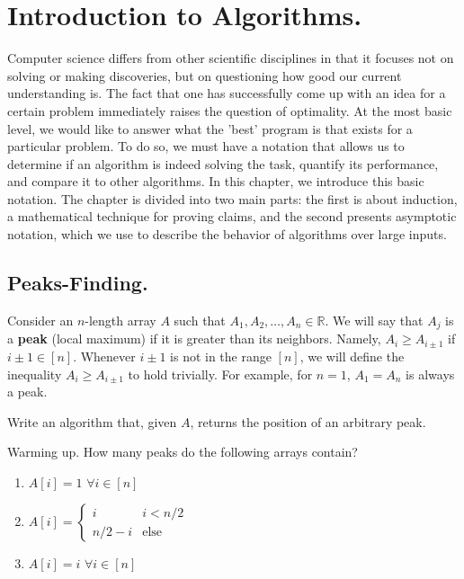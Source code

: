 
\newcommand*{\RECITATION}{}%
\newcommand*{\BOOK}{}%


\chapter{Introduction to Algorithms.}
\ifdefined\RECITATION
\else
Computer science differs from other scientific disciplines in that it focuses not on solving or making discoveries, but on questioning how good our current understanding is. The fact that one has successfully come up with an idea for a certain problem immediately raises the question of optimality. At the most basic level, we would like to answer what the 'best' program is that exists for a particular problem. To do so, we must have a notation that allows us to determine if an algorithm is indeed solving the task, quantify its performance, and compare it to other algorithms. In this chapter, we introduce this basic notation. The chapter is divided into two main parts: the first is about induction, a mathematical technique for proving claims, and the second presents asymptotic notation, which we use to describe the behavior of algorithms over large inputs.
\fi
\section{Peaks-Finding.}
\begin{example}
  Consider an $n$-length array $A$ such that $A_1, A_2, \ldots, A_n \in \mathbb{R}$. We will say that $A_{j}$ is a \textbf{peak} (local maximum) if it is greater than its neighbors. Namely, $A_{i} \ge A_{i\pm1}$ if $i\pm 1 \in [n]$. Whenever $i\pm 1$ is not in the range $[n]$, we will define the inequality $A_{i} \ge A_{i\pm 1}$ to hold trivially. For example, for $n=1$, $A_{1}=A_{n}$ is always a peak.

  Write an algorithm that, given $A$, returns the position of an arbitrary peak.
\end{example}


\begin{example}{Warming up.} \label{example:func} 
  How many peaks do the following arrays contain?
  \begin{enumerate}
    \item $A[i] = 1$   $\forall i \in [n]$
    \item $A[i] = \begin{cases}
        i & i < n/2 \\
        n/2 - i & \text{else}
      \end{cases}$
    \item $A[i] = i $  $\forall i \in [n]$
  \end{enumerate}
\end{example}



